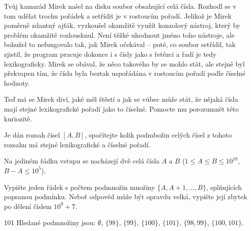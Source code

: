 





Tvůj kamarád Mirek našel na disku soubor obsahující celá čísla.
Rozhodl se v tom udělat trochu pořádek a setřídit je v rostoucím pořadí.
Jelikož je Mirek poměrně zdantný ajťák, vyzkoušel okamžitě využít konzolový nástroj,
který by problém okamžitě rozlousknul. Není těžké uhodnout jméno toho nástroje,
ale bohužel to nefungovalo tak, jak Mirek očekával
-- poté, co soubor setřídil, tak zjistil, že program pracuje
dokonce i s čísly jako s řetězci a řadí je tedy lexikograficky.
Mirek se obával, že něco takového by se mohlo stát, ale stejně byl překvapen tím,
že čísla byla beztak uspořádána v rostoucím pořadí podle číselné hodnoty.

Teď má se Mirek diví, jaké měl štěstí a jak se vůbec může stát,
že nějaká čísla mají stejné lexikografické pořadí jako to číselné.
Pomocte mu porozumnět této kuriozitě.


Je dán rozsah čísel $[A, B]$, spočítejte kolik podmbožin celých čísel z tohoto rozsahu
má stejné lexikografické a číselné pořadí.


Na jediném řádku vstupu se nacházejí dvě celá čísla $A$ a $B$
($1 \le A \le B \le 10^{18}$, $B - A \le 10^5$).


Vypište jeden řádek s počtem podmnožin množiny $\{A, A+1, \ldots, B\}$,
splňujících popsanou podmínku.
Neboť odpověd může být opravdu velká, vypište její zbytek po dělení číslem $10^9 + 7$.


 101
\sampleCOMMENT
Hledané podmnožiny jsou: $\emptyset$, $\{98\}$, $\{99\}$, $\{100\}$, $\{101\}$, $\{98, 99\}$, $\{100, 101\}$.
\sampleEND



